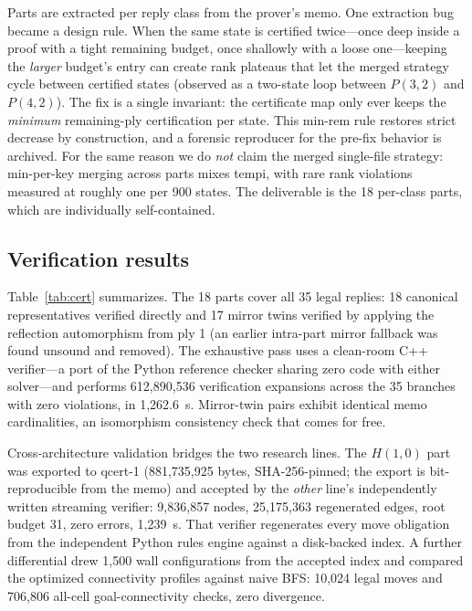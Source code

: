 \documentclass[conference]{IEEEtran}
\begin{document}
Parts are extracted per reply class from the prover's memo. One extraction bug became a design rule. When the same state is certified twice---once deep inside a proof with a tight remaining budget, once shallowly with a loose one---keeping the \emph{larger} budget's entry can create rank plateaus that let the merged strategy cycle between certified states (observed as a two-state loop between $P(3,2)$ and $P(4,2)$). The fix is a single invariant: the certificate map only ever keeps the \emph{minimum} remaining-ply certification per state. This min-rem rule restores strict decrease by construction, and a forensic reproducer for the pre-fix behavior is archived. For the same reason we do \emph{not} claim the merged single-file strategy: min-per-key merging across parts mixes tempi, with rare rank violations measured at roughly one per 900 states. The deliverable is the 18 per-class parts, which are individually self-contained.

\subsection{Verification results}

Table~\ref{tab:cert} summarizes. The 18 parts cover all 35 legal replies: 18 canonical representatives verified directly and 17 mirror twins verified by applying the reflection automorphism from ply 1 (an earlier intra-part mirror fallback was found unsound and removed). The exhaustive pass uses a clean-room C++ verifier---a port of the Python reference checker sharing zero code with either solver---and performs 612{,}890{,}536 verification expansions across the 35 branches with zero violations, in 1{,}262.6~s. Mirror-twin pairs exhibit identical memo cardinalities, an isomorphism consistency check that comes for free.

Cross-architecture validation bridges the two research lines. The $H(1,0)$ part was exported to \textsf{qcert-1} (881{,}735{,}925 bytes, SHA-256-pinned; the export is bit-reproducible from the memo) and accepted by the \emph{other} line's independently written streaming verifier: 9{,}836{,}857 nodes, 25{,}175{,}363 regenerated edges, root budget 31, zero errors, 1{,}239~s. That verifier regenerates every move obligation from the independent Python rules engine against a disk-backed index. A further differential drew 1{,}500 wall configurations from the accepted index and compared the optimized connectivity profiles against naive BFS: 10{,}024 legal moves and 706{,}806 all-cell goal-connectivity checks, zero divergence.
\end{document}
